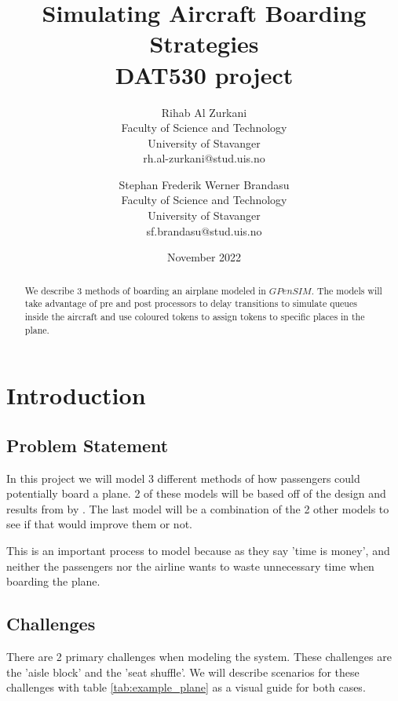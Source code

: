 \documentclass[english]{article}
\title{Simulating Aircraft Boarding Strategies\\
\large DAT530 project}
\author{
Rihab Al Zurkani\\
Faculty of Science and Technology\\
University of Stavanger\\
rh.al-zurkani@stud.uis.no
\and
Stephan Frederik Werner Brandasu\\
Faculty of Science and Technology\\
University of Stavanger\\
sf.brandasu@stud.uis.no
}
\date{November 2022}
\begin{document}
\maketitle
{}
\newpage

\tableofcontents
\newpage

\begin{abstract}
    We describe 3 methods of boarding an airplane modeled in $GPenSIM$. The models will take advantage of pre and post processors to delay transitions to simulate queues inside the aircraft and use coloured tokens to assign tokens to specific places in the plane.
\end{abstract}
\newpage



\section{Introduction}
\subsection{Problem Statement}
In this project we will model 3 different methods of how passengers could potentially board a plane. 2 of these models will be based off of the design and results from  by \citeauthor{STEFFEN201264}\cite{STEFFEN201264}. The last model will be a combination of the 2 other models to see if that would improve them or not.

This is an important process to model because as they say 'time is money', and neither the passengers nor the airline wants to waste unnecessary time when boarding the plane.


\subsection{Challenges}
There are 2 primary challenges when modeling the system. These challenges are the 'aisle block' and the 'seat shuffle'. We will describe scenarios for these challenges with table \ref{tab:example_plane} as a visual guide for both cases.
\end{document}
